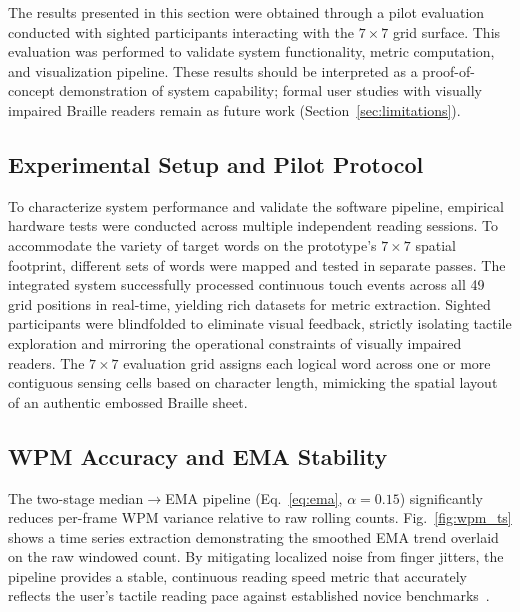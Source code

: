 \documentclass[conference]{IEEEtran}
\begin{document}
    The results presented in this section were obtained through a
    pilot evaluation conducted with sighted participants interacting
    with the $7\times7$ grid surface. This evaluation was performed
    to validate system functionality, metric computation, and
    visualization pipeline. These results should be
    interpreted as a proof-of-concept demonstration of system
    capability; formal user studies with visually impaired Braille
    readers remain as future work (Section~\ref{sec:limitations}).


    \subsection{Experimental Setup and Pilot Protocol}

    To characterize system performance and validate the software pipeline, empirical hardware tests were conducted across multiple independent reading sessions. To accommodate the variety of target words on the prototype's $7\times7$ spatial footprint, different sets of words were mapped and tested in separate passes. The integrated system successfully processed continuous touch events across all 49 grid positions in real-time, yielding rich datasets for metric extraction. Sighted participants were blindfolded to eliminate visual feedback, strictly isolating tactile exploration and mirroring the operational constraints of visually impaired readers. The $7\times7$ evaluation grid assigns each logical word across one or more contiguous sensing cells based on character length, mimicking the spatial layout of an authentic embossed Braille sheet.



    \subsection{WPM Accuracy and EMA Stability}

    The two-stage median$\to$EMA pipeline (Eq.~\ref{eq:ema}, $\alpha=0.15$) significantly reduces per-frame WPM variance relative to raw rolling counts. Fig.~\ref{fig:wpm_ts} shows a time series extraction demonstrating the smoothed EMA trend overlaid on the raw windowed count. By mitigating localized noise from finger jitters, the pipeline provides a stable, continuous reading speed metric that accurately reflects the user's tactile reading pace against established novice benchmarks~\cite{b12}.
\end{document}
